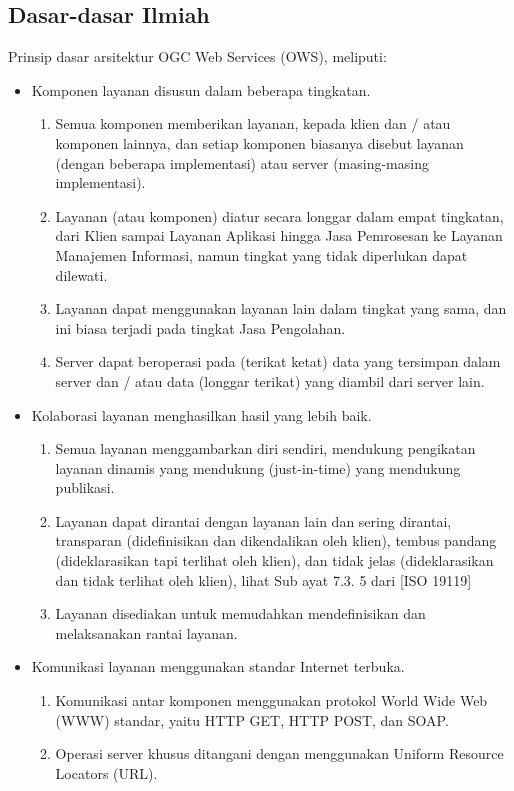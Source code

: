 \subsection{Dasar-dasar Ilmiah}
Prinsip dasar arsitektur OGC Web Services (OWS), meliputi:

\begin{itemize} 
\item Komponen layanan disusun dalam beberapa tingkatan.
\begin{enumerate}
\item Semua komponen memberikan layanan, kepada klien dan / atau komponen lainnya, dan setiap komponen biasanya disebut layanan (dengan beberapa implementasi) atau server (masing-masing implementasi).
\item Layanan (atau komponen) diatur secara longgar dalam empat tingkatan, dari Klien sampai Layanan Aplikasi hingga Jasa Pemrosesan ke Layanan Manajemen Informasi, namun tingkat yang tidak diperlukan dapat dilewati.
\item Layanan dapat menggunakan layanan lain dalam tingkat yang sama, dan ini biasa terjadi pada tingkat Jasa Pengolahan.
\item Server dapat beroperasi pada (terikat ketat) data yang tersimpan dalam server dan / atau data (longgar terikat) yang diambil dari server lain.
\end{enumerate}
\item Kolaborasi layanan menghasilkan hasil yang lebih baik.
\begin{enumerate}
\item Semua layanan menggambarkan diri sendiri, mendukung pengikatan layanan dinamis yang mendukung (just-in-time) yang mendukung publikasi.
\item Layanan dapat dirantai dengan layanan lain dan sering dirantai, transparan (didefinisikan dan dikendalikan oleh klien), tembus pandang (dideklarasikan tapi terlihat oleh klien), dan tidak jelas (dideklarasikan dan tidak terlihat oleh klien), lihat Sub ayat 7.3. 5 dari [ISO 19119]
\item Layanan disediakan untuk memudahkan mendefinisikan dan melaksanakan rantai layanan.
\end{enumerate}
\item Komunikasi layanan menggunakan standar Internet terbuka.
\begin{enumerate}
\item Komunikasi antar komponen menggunakan protokol World Wide Web (WWW) standar, yaitu HTTP GET, HTTP POST, dan SOAP.
\item Operasi server khusus ditangani dengan menggunakan Uniform Resource Locators (URL).

\end{enumerate}
\end{itemize}
